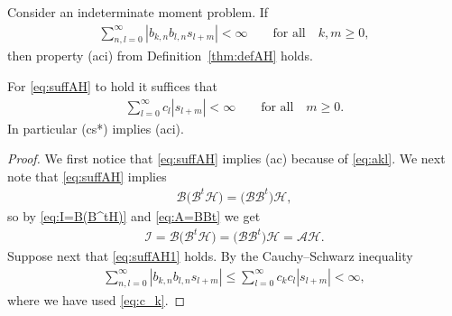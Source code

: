 \begin{lem}\label{thm:suffAH} Consider an indeterminate moment problem. If
\begin{gather}\label{eq:suffAH}
\sum_{n,l=0}^\infty |b_{k,n}b_{l,n}s_{l+m}|<\infty\qquad \mbox{for all}\quad k,m\ge 0,
\end{gather}
then property {\rm (aci)} from Definition~{\rm \ref{thm:defAH}} holds.

For \eqref{eq:suffAH} to hold it suffices that
\begin{gather}\label{eq:suffAH1}
\sum_{l=0}^\infty c_l |s_{l+m}|<\infty\qquad\mbox{for all}\quad m\ge 0.
\end{gather}
In particular {\rm (cs*)} implies {\rm (aci)}.
\end{lem}

\begin{proof} We first notice that \eqref{eq:suffAH} implies (ac) because of \eqref{eq:akl}. We next note that \eqref{eq:suffAH} implies
\begin{gather*}
\mathcal B\big(\mathcal B^t\mathcal H\big)=\big(\mathcal B\mathcal B^t\big)\mathcal H,
\end{gather*}
so by \eqref{eq:I=B(B^tH)} and \eqref{eq:A=BBt} we get
\begin{gather*}
\mathcal I=\mathcal B\big(\mathcal B^t\mathcal H\big)=\big(\mathcal B\mathcal B^t\big)\mathcal H=\mathcal A\mathcal H.
\end{gather*}
Suppose next that \eqref{eq:suffAH1} holds. By the Cauchy--Schwarz inequality
\begin{gather*}
\sum_{n,l=0}^\infty |b_{k,n}b_{l,n}s_{l+m}|\le \sum_{l=0}^\infty c_kc_l|s_{l+m}|<\infty,
\end{gather*}
where we have used \eqref{eq:c_k}.
\end{proof}

